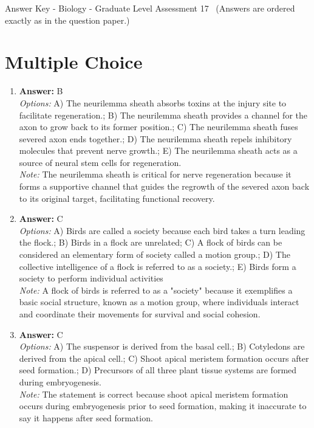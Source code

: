\documentclass[12pt]{article}
\begin{document}
\begin{center}
Answer Key - Biology - Graduate Level Assessment 17 \
\small (Answers are ordered exactly as in the question paper.)
\end{center}

\section*{Multiple Choice}
\begin{enumerate}[label=\arabic*.]
\item \textbf{Answer:} B
\\ \textit{Options:} A) The neurilemma sheath absorbs toxins at the injury site to facilitate regeneration.; B) The neurilemma sheath provides a channel for the axon to grow back to its former position.; C) The neurilemma sheath fuses severed axon ends together.; D) The neurilemma sheath repels inhibitory molecules that prevent nerve growth.; E) The neurilemma sheath acts as a source of neural stem cells for regeneration.
\\ \textit{Note:} The neurilemma sheath is critical for nerve regeneration because it forms a supportive channel that guides the regrowth of the severed axon back to its original target, facilitating functional recovery.
\item \textbf{Answer:} C
\\ \textit{Options:} A) Birds are called a society because each bird takes a turn leading the flock.; B) Birds in a flock are unrelated; C) A flock of birds can be considered an elementary form of society called a motion group.; D) The collective intelligence of a flock is referred to as a society.; E) Birds form a society to perform individual activities
\\ \textit{Note:} A flock of birds is referred to as a "society" because it exemplifies a basic social structure, known as a motion group, where individuals interact and coordinate their movements for survival and social cohesion.
\item \textbf{Answer:} C
\\ \textit{Options:} A) The suspensor is derived from the basal cell.; B) Cotyledons are derived from the apical cell.; C) Shoot apical meristem formation occurs after seed formation.; D) Precursors of all three plant tissue systems are formed during embryogenesis.
\\ \textit{Note:} The statement is correct because shoot apical meristem formation occurs during embryogenesis prior to seed formation, making it inaccurate to say it happens after seed formation.

\end{enumerate}
\end{document}
